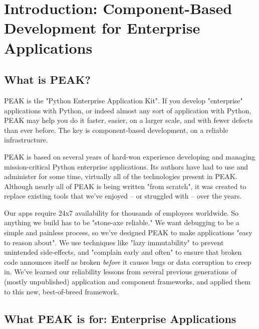 \chapter{Introduction: Component-Based Development for Enterprise Applications}

\section{What is PEAK?}

PEAK is the "Python Enterprise Application Kit". If you develop
"enterprise" applications with Python, or indeed almost any sort of
application with Python, PEAK may help you do it faster, easier, on a
larger scale, and with fewer defects than ever before. The key is
component-based development, on a reliable infrastructure. 

PEAK is based on several years of hard-won experience developing and
managing mission-critical Python enterprise applications. Its authors
have had to use and administer for some time, virtually all of the
technologies present in PEAK. Although nearly all of PEAK is being
written "from scratch", it was created to replace existing tools that
we've enjoyed -- or struggled with -- over the years. 

Our apps require 24x7 availability for thousands of employees worldwide.
So anything we build has to be "stone-axe reliable." We want debugging
to be a simple and painless process, so we've designed PEAK to make
applications "easy to reason about". We use techniques like "lazy
immutability" to prevent unintended side-effects, and "complain early
and often" to ensure that broken code announces itself as broken
\emph{before} it causes bugs or data corruption to creep in.  We've learned
our reliability lessons from several previous generations of (mostly
unpublished) application and component frameworks, and applied them to
this new, best-of-breed framework. 














\section{What PEAK is for: Enterprise Applications} 

